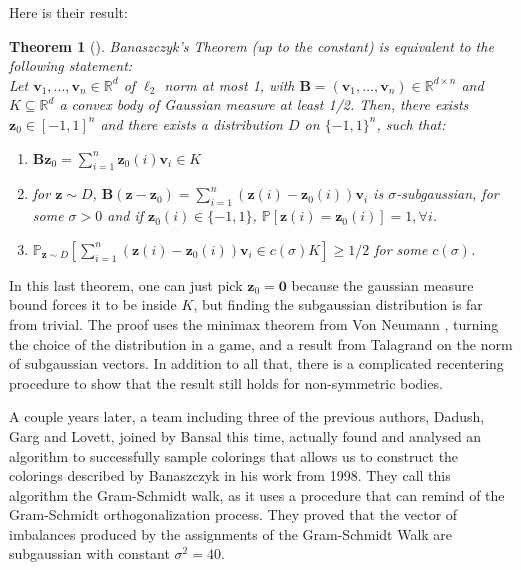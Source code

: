 \documentclass[12pt]{article}
\newtheorem{theorem}{Theorem}
\begin{document}
Here is their result:
\begin{theorem}[\cite{construct}]\label{equivalence}
Banaszczyk's Theorem (up to the constant) is equivalent to the following statement:\\
Let $\textbf{v}_1, \dots, \textbf{v}_n \in \mathbb{R}^d$ of $\ell_2$ norm at most 1, with $\textbf{B}= (\textbf{v}_1, \dots, \textbf{v}_n) \in \mathbb{R}^{d \times n}$ and $K \subseteq \mathbb{R}^d$ a convex body  of Gaussian measure at least 1/2.
Then, there exists $\textbf{z}_0 \in [-1,1]^n$ and there exists a distribution $D$ on $\{-1,1\}^n$, such that: 
\begin{enumerate}
    \item  $\textbf{B}\textbf{z}_0 = \sum_{i=1}^n \textbf{z}_0(i)\textbf{v}_i \in K$\\
    \item  for $\textbf{z} \sim D$, $\textbf{B}(\textbf{z}-\textbf{z}_0)= \sum_{i=1}^n (\textbf{z}(i)-\textbf{z}_0(i))\textbf{v}_i$ is $\sigma$-subgaussian, for some $\sigma >0$ and if $\textbf{z}_0(i) \in \{-1, 1\}$, $\mathbb{P}[\textbf{z}(i)=\textbf{z}_0(i)]=1, \forall i$.
    \item $\mathbb{P}_{\textbf{z} \sim D}[\sum_{i=1}^n (\textbf{z}(i)- \textbf{z}_0(i))\textbf{v}_i \in c(\sigma)K] \geq 1/2$ for some $c(\sigma)$.
\end{enumerate}
\end{theorem}
In this last theorem, one can just pick $\textbf{z}_0=\textbf{0}$ because the gaussian measure bound forces it to be inside $K$, but finding the subgaussian distribution is far from trivial. The proof uses the minimax theorem from Von Neumann \cite{neumann1928theorie}, turning the choice of the distribution in a game, and a result from Talagrand \cite{talagrand2005generic} on the norm of subgaussian vectors. In addition to all that, there is a complicated recentering procedure to show that the result still holds for non-symmetric bodies.

A couple years later, a team including three of the previous authors, Dadush, Garg and Lovett, joined by Bansal this time, actually found and analysed an algorithm to successfully sample colorings that allows us to construct the colorings described by Banaszczyk in his work from 1998. They call this algorithm the Gram-Schmidt walk, as it uses a procedure that can remind of the Gram-Schmidt orthogonalization process. They proved that the vector of imbalances produced by the assignments of the Gram-Schmidt Walk are subgaussian with constant $\sigma^2=40$.
\end{document}
